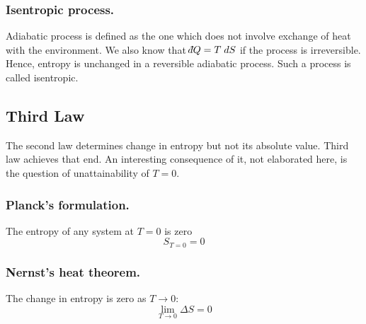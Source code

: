\documentclass[../../../Main.tex]{subfiles}
\begin{document}
\subsubsection*{Isentropic process.} Adiabatic process is defined as the one which does not involve exchange of heat with the environment. We also know that $\dbar Q= T\; d S$ if the process is irreversible. Hence, entropy is unchanged in a reversible adiabatic process. Such a process is called isentropic. 

\subsection*{Third Law}
The second law determines change in entropy but not its absolute value. Third law achieves that end. An interesting consequence of it, not elaborated here, is the question of unattainability of $T = 0$.

\subsubsection*{Planck’s formulation.} The entropy of any system at $T = 0$ is zero
\begin{equation*}
    S_{T=0}=0
\end{equation*}

\subsubsection*{Nernst’s heat theorem.} The change in entropy is zero as $T \rightarrow 0$:
\begin{equation*}
    \lim_{T\rightarrow0}\Delta S=0
\end{equation*}
\end{document}
